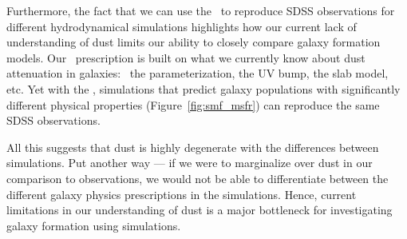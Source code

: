 Furthermore, the fact that we can use the \eda~to reproduce SDSS observations 
for different hydrodynamical simulations highlights how our current lack of 
understanding of dust limits our ability to closely compare galaxy
formation models. 
Our \eda~prescription is built on what we currently know about dust attenuation
in galaxies: \eg~the \citealt{noll2009} parameterization, the UV bump, the slab model, etc.
Yet with the \eda, simulations that predict galaxy populations with
significantly different physical properties (Figure~\ref{fig:smf_msfr}) can
reproduce the same SDSS observations. 

All this suggests that dust is highly degenerate with the differences between simulations. 
Put another way --- if we were to marginalize over dust in our comparison to
observations, we would not be able to differentiate between the different
galaxy physics prescriptions in the simulations. 
Hence, current limitations in our understanding of dust is a major bottleneck
for investigating galaxy formation using simulations.


